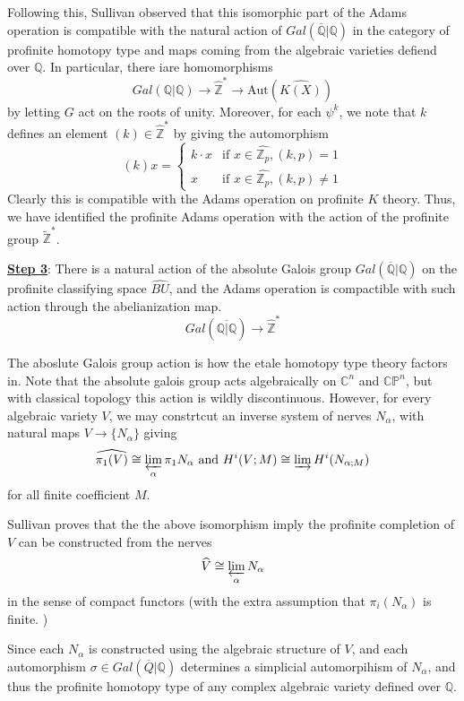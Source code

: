 \documentclass{article}
\theoremstyle{definition}
\theoremstyle{definition}
\theoremstyle{definition}
\theoremstyle{definition}
\theoremstyle{definition}
\theoremstyle{definition}
\theoremstyle{definition}
\begin{document}
Following this, Sullivan observed that this isomorphic part of the Adams operation is compatible with the natural action of $Gal(\overline{\mathbb{Q}}|\mathbb{Q})$ in the category of profinite homotopy type and maps coming from the algebraic varieties defiend over $\mathbb{Q}$. In particular, there iare homomorphisms
\[Gal(\mathbb{Q}|\mathbb{Q})\to \widehat{\mathbb{Z}}^*\to \textrm{Aut}(\widehat{K(X)})\]
by letting $G$ act on the roots of unity. Moreover, for each $\psi^k$, we note that $k$ defines an element $(k)\in \widehat{\mathbb{Z}}^*$ by giving the automorphism 
\[(k)x=\begin{cases}
	k\cdot x & \textrm{if } x\in \widehat{\mathbb{Z}_p}, (k,p)=1\\
	x & \textrm{if } x\in  \widehat{\mathbb{Z}_p}, (k,p)\neq 1
\end{cases}\]
Clearly this is compatible with the Adams operation on profinite $K$ theory. Thus, we have identified the profinite Adams operation with the action of the profinite group $\widetilde{\mathbb{Z}}^*$. 

\underline{\textbf{Step 3}}: There is a natural action of the absolute Galois group $Gal(\overline{\mathbb{Q}}|\mathbb{Q})$ on the profinite classifying space $\widehat{BU}$, and the Adams operation is compactible with such action through the abelianization map.
\[Gal(\overline{\mathbb{Q}|\mathbb{Q}})\to \widehat{\mathbb{Z}}^*\]

The aboslute Galois group action is how the etale homotopy type theory factors in. Note that the absolute galois group acts algebraically on $\mathbb{C}^n$ and $\mathbb{CP}^n$, but with classical topology this action is wildly discontinuous. However, for every algebraic variety $V$, we may constrtcut an inverse system of nerves $N_{\alpha}$, with natural maps $V\to \{N_{\alpha}\}$ giving 
\[\widehat{\pi_1(V)}\cong \varprojlim_{\alpha}\pi_1N_{\alpha} \textrm{   and   } H^i(V; M)\cong \varinjlim H^i(N_{\alpha; M})\]
 for all finite coefficient $M$.


Sullivan proves that the the above isomorphism imply the profinite completion of $V$ can be constructed from the nerves 
\[\widehat{V}\cong \varprojlim_{\alpha} N_{\alpha}\]
in the sense of compact functors (with the extra assumption that $\pi_i(N_{\alpha})$ is finite. )


Since each $N_{\alpha}$ is constructed using the algebraic structure of $V$, and each automorphism $\sigma\in Gal(\overline{Q}|\mathbb{Q})$ determines a simplicial automorpihism of $N_{\alpha}$, and thus the profinite homotopy type of any complex algebraic variety defined over $\mathbb{Q}$.
\end{document}
